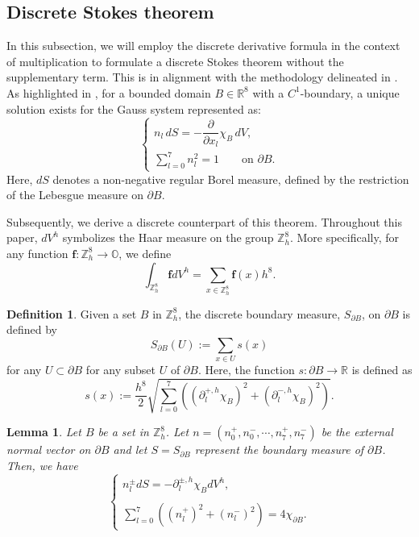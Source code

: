 \documentclass{amsart}
\newtheorem{lemma}[theorem]{Lemma}
\theoremstyle{definition}
\newtheorem{definition}[theorem]{Definition}
\theoremstyle{remark}
\numberwithin{equation}{section}
\newcommand{\R}{\mathbb{R}}
\newcommand{\p}{\partial}
\newcommand{\OO}{\mathbb O}
\newcommand{\Z}{\mathbb Z}
\newcommand{\f}{\bm{f}}
\begin{document}
\subsection{Discrete Stokes theorem}
 In this subsection, we will employ the discrete derivative formula in the context of multiplication to formulate a discrete Stokes theorem without the supplementary term. This is in alignment with the methodology delineated in \cite{RZ2017, RZ2022}. As highlighted in \cite{RZ2017, RZ2022}, for a bounded domain  $B\in \R^8$ with a $C^1$-boundary, a unique solution exists for the Gauss system represented as:
 \begin{equation}
 	\label{2023-09-08 09:37:46}
 	\begin{cases}
 		n_l\, dS =-\dfrac{\p}{\p x_l}\chi_B\, dV,\\[2mm]
 		\sum\limits_{l=0}^7 n_l^2=1 \qquad \text{on }\p B.
 	\end{cases}
 \end{equation}
 Here, $dS$ denotes a non-negative regular Borel measure, defined by the restriction of the Lebesgue measure on $\p B$.

 Subsequently, we derive a discrete counterpart of this theorem. Throughout this paper, $dV^h$ symbolizes the Haar measure on the group $\Z^8_h$. More specifically, for any function $\f: \Z^8_h\longrightarrow \OO$, we define
 \[
\int_{\Z^8_h} \f dV^h =\sum\limits_{x\in \Z^8_h} \f(x)h^8.
\]



\begin{definition}\label{2023-09-06 21:08:52}
	Given a set $B$ in $\Z^8_h$, the discrete boundary measure, $S_{\p B}$, on $\p B$ is defined by
    \[
S_{\p B}(U):=\sum\limits_{x\in U} s(x)
\] for any $U\subset   \p B$ for any subset $U$ of $\p B$. Here, the function $s: \p B\longrightarrow \R$ is defined as \[
s(x):=\frac{h^8}{2}\sqrt{\sum\limits_{l=0}^7 \left((\p_l^{+,h}\chi_B)^2+(\p_l^{-,h}\chi_B)^2\right)}.
\]
\end{definition}



\begin{lemma}\label{2023-09-13 18:19:13}
	Let $B$ be a set in $\Z^8_h$. Let $n=(n_0^+,n_0^-,\cdots,n_7^+,n_7^-)$ be the external normal vector on $\p B$ and let $S=S_{\p B}$ represent the boundary measure of $\p B$. Then, we have
    \begin{equation}
        \label{2023-09-06 19:05:40}
        \begin{cases}
            n_l^{\pm} dS = -\p_l^{\pm,h } \chi_B dV^h  ,\\\\
            \sum\limits_{l=0}^7\left((n_l^+)^2+(n_l^-)^2\right)= 4\chi_{\p B}.
        \end{cases}
    \end{equation}


\end{lemma}
\end{document}
